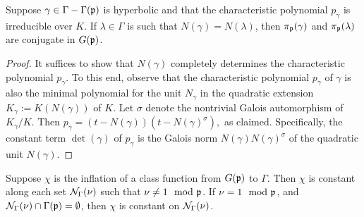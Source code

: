 \documentclass[11pt]{amsart}
\begin{document}
\begin{thm}
	Suppose $\gamma\in \Gamma - \Gamma(\mathfrak{p})$ is hyperbolic and that the characteristic polynomial $p_{\gamma}$ is irreducible over $K$. If $\lambda \in \Gamma$ is such that $N(\gamma)=N(\lambda)$, then $\pi_{\mathfrak{p}}(\gamma)$ and $\pi_{\mathfrak{p}}(\lambda)$ are conjugate in $G(\mathfrak{p})$. 
\end{thm}
  
\begin{proof}
		It suffices to show that $N(\gamma)$ completely determines the characteristic polynomial $p_{\gamma}$.  To this end, observe that the characteristic polynomial $p_{\gamma}$ of $\gamma$ is also the minimal polynomial for the unit $N_{\gamma}$ in the quadratic extension $K_{\gamma}:= K(N(\gamma))$ of $K$. Let $\sigma$ denote the nontrivial Galois automorphism of $K_{\gamma}/K$. Then $p_{\gamma}=(t-N(\gamma))(t-N(\gamma)^{\sigma}),$ as claimed.  Specifically, the constant term $\det(\gamma)$ of $p_{\gamma}$ is the Galois norm $N(\gamma)N(\gamma)^{\sigma}$ of the quadratic unit $N(\gamma)$.  
\end{proof}

\begin{cor}
Suppose $\chi$ is the inflation of a class function from $G(\mathfrak{p})$ to $\Gamma$. Then $\chi$ is constant along each set $\mathcal{N}_{\Gamma}(\nu)$ such that $\nu \neq 1 \mod {\mathfrak{p}}$. If $\nu=1 \mod {\mathfrak{p}}$,  and $\mathcal{N}_{\Gamma}(\nu)\cap \Gamma(\mathfrak{p})= \emptyset$, then $\chi$ is constant on $\mathcal{N}_{\Gamma}(\nu)$. 
\end{cor}
  
\end{document}

